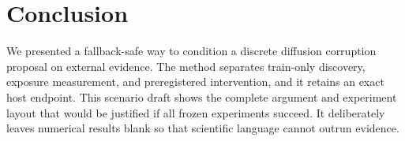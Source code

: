 \documentclass[letterpaper]{article}
\begin{document}
\section{Conclusion}
We presented a fallback-safe way to condition a discrete diffusion corruption proposal on external evidence. The method separates train-only discovery, exposure measurement, and preregistered intervention, and it retains an exact host endpoint. This scenario draft shows the complete argument and experiment layout that would be justified if all frozen experiments succeed. It deliberately leaves numerical results blank so that scientific language cannot outrun evidence.



\end{document}
